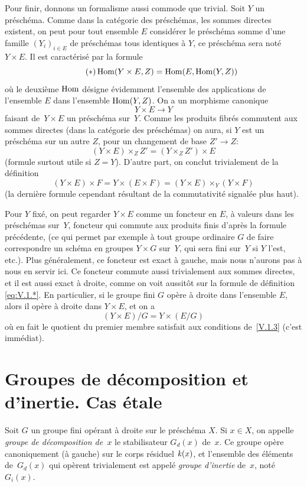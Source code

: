Pour finir, donnons un formalisme aussi commode que trivial. Soit $Y$
un pr\'esch\'ema. Comme dans la cat\'egorie des
pr\'esch\'emas, les sommes directes existent, on peut pour tout
ensemble $E$ consid\'erer le pr\'esch\'ema somme d'une famille
$(Y_i)_{i\in E}$ de pr\'esch\'emas tous identiques \`a $Y$, ce
pr\'esch\'ema sera not\'e $Y\times E$.
Il est caract\'eris\'e par la formule
\begin{equation*}
\label{eq:V.1.*}
\tag{$*$} \operatorname{Hom}(Y\times E,Z) = \operatorname{Hom}(E,\operatorname{Hom}(Y,Z))
\end{equation*}
o\`u le deuxi\`eme $\operatorname{Hom}$ d\'esigne \'evidemment l'ensemble
des applications de l'ensemble $E$ dans l'ensemble $\operatorname{Hom}(Y,Z)$. On a
un morphisme canonique
$$
Y\times E\to Y
$$
faisant de~$Y\times E$ un pr\'esch\'ema sur~$Y$. Comme les
produits fibr\'es commutent aux sommes directes (dans la
cat\'egorie des pr\'esch\'emas) on aura, si $Y$ est un
pr\'esch\'ema sur un autre $Z$, pour un changement de base $Z'\to
Z$:
$$
(Y\times E)\times_Z Z'=(Y\times_Z Z')\times E
$$
(formule surtout utile si $Z=Y$). D'autre part, on conclut
trivialement de la d\'efinition
$$
(Y\times E)\times F=Y\times(E\times F)=(Y\times E)\times_Y(Y\times F)
$$
(la derni\`ere formule cependant r\'esultant de la
commutativit\'e signal\'ee plus haut).

Pour $Y$ fix\'e, on peut regarder $Y\times E$ comme un foncteur en
$E$, \`a valeurs dans les pr\'esch\'emas sur~$Y$, foncteur qui
commute aux produits finis d'apr\`es la formule pr\'ec\'edente,
(ce qui permet par exemple \`a tout groupe ordinaire $G$ de faire
correspondre un sch\'ema en groupes $Y\times G$ sur~$Y$, qui sera
fini sur~$Y$ si $Y$ l'est, etc.). Plus g\'en\'eralement, ce
foncteur est \og exact \`a gauche\fg, mais nous n'aurons pas \`a nous
en servir ici. Ce foncteur commute aussi trivialement aux sommes
directes, et il est aussi \og exact \`a droite\fg, comme on voit
aussit\^ot sur la formule de d\'efinition \eqref{eq:V.1.*}. En
particulier, si le groupe fini $G$ op\`ere \`a droite dans
l'ensemble $E$, alors il op\`ere \`a droite dans $Y\times E$, et
on a
$$
(Y\times E)/G = Y\times (E/G)
$$
o\`u en fait le quotient du premier membre satisfait aux conditions
de~\ref{V.1.3} (c'est imm\'ediat).

\section{Groupes de d\'ecomposition et d'inertie. Cas \'etale}
\label{V.2}
Soit $G$
un
groupe fini op\'erant \`a droite sur le pr\'esch\'ema $X$. Si
$x\in X$, on appelle
\emph{groupe de décomposition de~$x$}
le stabilisateur $G_d(x)$ de~$x$. Ce groupe op\`ere canoniquement
(\`a gauche) sur le corps r\'esiduel
$\mathit{k}(x)$, et l'ensemble
des \'el\'ements de~$G_d(x)$ qui op\`erent trivialement est
appel\'e \emph{groupe d'inertie}
de~$x$, not\'e~$G_i(x)$.

